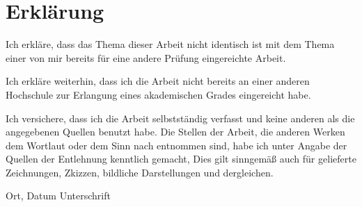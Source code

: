 \section*{Erklärung}

Ich erkläre, dass das Thema dieser Arbeit nicht identisch ist mit dem Thema einer von mir bereits für eine andere Prüfung eingereichte Arbeit.\par
Ich erkläre weiterhin, dass ich die Arbeit nicht bereits an einer anderen Hochschule zur Erlangung eines akademischen Grades eingereicht habe.\par
\vspace{2cm}
Ich versichere, dass ich die Arbeit selbstständig verfasst und keine anderen als die angegebenen Quellen benutzt habe. Die Stellen der Arbeit, die anderen Werken dem Wortlaut oder dem Sinn nach entnommen sind, habe ich unter Angabe der Quellen der Entlehnung kenntlich gemacht, Dies gilt sinngemäß auch für gelieferte Zeichnungen, Zkizzen, bildliche Darstellungen und dergleichen.

\vfill

\hspace{2cm} Ort, Datum \hfill Unterschrift \hspace{2cm}